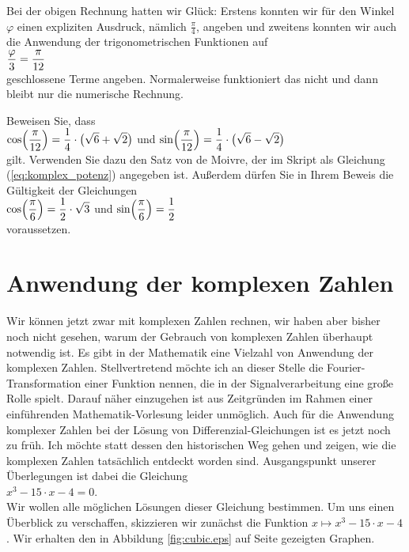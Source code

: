 \remark
Bei der obigen Rechnung hatten wir Glück:  Erstens konnten wir für den Winkel $\varphi$ einen expliziten
Ausdruck, nämlich $\frac{\pi}{4}$, angeben und zweitens konnten wir auch die Anwendung der trigonometrischen
Funktionen auf
\\[0.2cm]
\hspace*{1.3cm}
$\displaystyle\frac{\varphi}{3} = \frac{\pi}{12}$ 
\\[0.2cm]
geschlossene Terme angeben.  Normalerweise
funktioniert das nicht und dann bleibt nur die numerische Rechnung. 

\exercise
Beweisen Sie, dass 
\\[0.2cm]
\hspace*{1.3cm}
$\displaystyle\cos\Bigl(\frac{\pi}{12}\Bigr) = \frac{1}{4} \cdot \bigl(\sqrt{6} + \sqrt{2}\bigr)$ \quad und \quad
$\displaystyle\sin\Bigl(\frac{\pi}{12}\Bigr) = \frac{1}{4} \cdot \bigl(\sqrt{6} - \sqrt{2}\bigr)$
\\[0.2cm]
gilt.  Verwenden Sie dazu den Satz von de Moivre, der im Skript als Gleichung
(\ref{eq:komplex_potenz}) angegeben ist. 
Außerdem dürfen Sie in Ihrem Beweis die Gültigkeit der Gleichungen
\\[0.2cm]
\hspace*{1.3cm}
$\displaystyle\cos\Bigl(\frac{\pi}{6}\Bigr) = \frac{1}{2}\cdot\sqrt{3}$ \quad und \quad $\displaystyle\sin\Bigl(\frac{\pi}{6}\Bigr) = \frac{1}{2}$
\\[0.2cm]
voraussetzen.
\exend

\section{Anwendung der komplexen Zahlen}
Wir können jetzt zwar mit komplexen Zahlen rechnen, wir haben aber bisher noch nicht gesehen, warum der 
Gebrauch von komplexen Zahlen überhaupt notwendig ist.  Es gibt in der Mathematik eine Vielzahl von
Anwendung der komplexen Zahlen.  Stellvertretend möchte ich an dieser Stelle die Fourier-Transformation
einer Funktion nennen, die in der Signalverarbeitung eine große Rolle spielt.  Darauf näher einzugehen
ist aus Zeitgründen im Rahmen einer einführenden Mathematik-Vorlesung leider unmöglich.  Auch für die
Anwendung komplexer Zahlen bei der Lösung von Differenzial-Gleichungen ist es jetzt noch zu früh.  Ich
möchte statt dessen den historischen Weg gehen und zeigen, wie die komplexen Zahlen tatsächlich entdeckt
worden sind.  Ausgangspunkt unserer Überlegungen ist dabei die Gleichung
\\[0.2cm]
\hspace*{1.3cm}
$x^3 - 15 \cdot x - 4 = 0$.
\\[0.2cm]
Wir wollen alle möglichen Lösungen dieser Gleichung bestimmen.  Um uns einen Überblick zu verschaffen,
skizzieren wir zunächst die Funktion $x \mapsto x^3 - 15 \cdot x - 4$.  Wir erhalten den in Abbildung
\ref{fig:cubic.eps} auf Seite \pageref{fig:cubic.eps} gezeigten Graphen.


